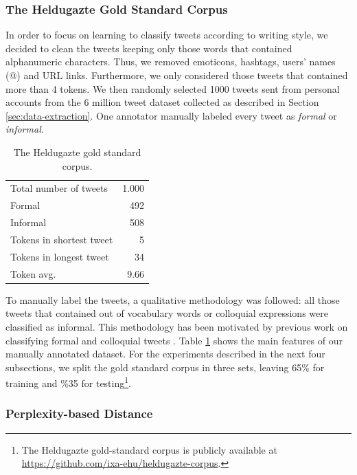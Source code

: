 \documentclass[information,article,submit,moreauthors,pdftex,10pt,a4paper]{Definitions/mdpi}
\begin{document}
\subsubsection{The Heldugazte Gold Standard Corpus}\label{sec:gold-standard-data}

In order to focus on learning to classify tweets according to writing style, we decided to clean the tweets keeping only those words that contained alphanumeric characters. Thus, we removed emoticons, hashtags, users' names (@) and URL links. Furthermore, we only considered those tweets that contained more than 4 tokens. We then randomly selected 1000 tweets sent from personal accounts from the 6 million tweet dataset collected as described in Section \ref{sec:data-extraction}. One annotator manually labeled every tweet as \emph{formal} or \emph{informal}.

\begin{table}[H]
  \centering
  \begin{tabular}{lr} \hline \hline
    Total number of tweets & 1.000 \\
    Formal & 492 \\
    Informal & 508 \\
    Tokens in shortest tweet & 5 \\
    Tokens in longest tweet & 34 \\
    Token avg. & 9.66 \\ \hline
  \end{tabular}
  \caption{The Heldugazte gold standard corpus.}
  \label{tab:gold-corpus}
\end{table}

To manually label the tweets, a qualitative methodology was followed: all those tweets that contained out of vocabulary words or colloquial expressions were classified as informal. This methodology has been motivated by previous work on classifying formal and colloquial tweets \cite{gonzalez2015analysis}. Table \ref{tab:gold-corpus} shows the main features of our manually annotated dataset. For the experiments described in the next four subsections, we split the gold standard corpus in three sets, leaving 65\% for training and \%35 for testing\footnote{The Heldugazte gold-standard corpus is publicly available at \url{https://github.com/ixa-ehu/heldugazte-corpus}.}.

\subsubsection{Perplexity-based Distance}\label{sec:unsup-appr-text}
\end{document}
